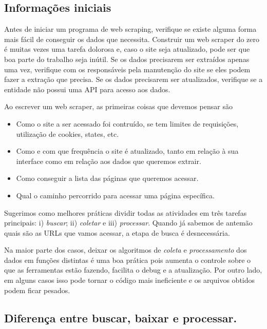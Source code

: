 \documentclass[]{book}
\providecommand{\tightlist}{%
  \setlength{\itemsep}{0pt}\setlength{\parskip}{0pt}}
\begin{document}
\subsection{Informações iniciais}\label{informacoes-iniciais}

Antes de iniciar um programa de web scraping, verifique se existe alguma
forma mais fácil de conseguir os dados que necessita. Construir um web
scraper do zero é muitas vezes uma tarefa dolorosa e, caso o site seja
atualizado, pode ser que boa parte do trabalho seja inútil. Se os dados
precisarem ser extraídos apenas uma vez, verifique com os responsáveis
pela manutenção do site se eles podem fazer a extração que precisa. Se
os dados precisarem ser atualizados, verifique se a entidade não possui
uma API para acesso aos dados.

Ao escrever um web scraper, as primeiras coisas que devemos pensar são

\begin{itemize}
\tightlist
\item
  Como o site a ser acessado foi contruído, se tem limites de
  requisições, utilização de cookies, states, etc.
\item
  Como e com que frequência o site é atualizado, tanto em relação à sua
  interface como em relação aos dados que queremos extrair.
\item
  Como conseguir a lista das páginas que queremos acessar.
\item
  Qual o caminho percorrido para acessar uma página específica.
\end{itemize}

Sugerimos como melhores práticas dividir todas as atividades em três
tarefas principais: i) \emph{buscar}; ii) \emph{coletar} e iii)
\emph{processar}. Quando já sabemos de antemão quais são as URLs que
vamos acessar, a etapa de busca é desnecessária.

Na maior parte dos casos, deixar os algoritmos de \emph{coleta} e
\emph{processamento} dos dados em funções distintas é uma boa prática
pois aumenta o controle sobre o que as ferramentas estão fazendo,
facilita o debug e a atualização. Por outro lado, em alguns casos isso
pode tornar o código mais ineficiente e os arquivos obtidos podem ficar
pesados.

\subsection{Diferença entre buscar, baixar e
processar.}\label{diferenca-entre-buscar-baixar-e-processar.}
\end{document}
